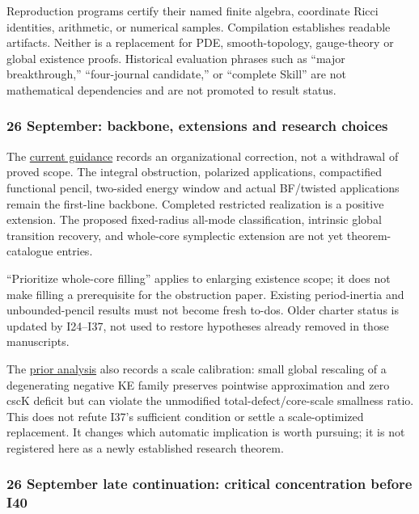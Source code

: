 \documentclass[
  10pt,
]{article}
\begin{document}
Reproduction programs certify their named finite algebra, coordinate
Ricci identities, arithmetic, or numerical samples. Compilation
establishes readable artifacts. Neither is a replacement for PDE,
smooth-topology, gauge-theory or global existence proofs. Historical
evaluation phrases such as ``major breakthrough,'' ``four-journal
candidate,'' or ``complete Skill'' are not mathematical dependencies and
are not promoted to result status.

\hypertarget{september-backbone-extensions-and-research-choices}{%
\subsubsection{26 September: backbone, extensions and research
choices}\label{september-backbone-extensions-and-research-choices}}

The \href{../guidance/LINE1_CURRENT.md}{current guidance} records an
organizational correction, not a withdrawal of proved scope. The
integral obstruction, polarized applications, compactified functional
pencil, two-sided energy window and actual BF/twisted applications
remain the first-line backbone. Completed restricted realization is a
positive extension. The proposed fixed-radius all-mode classification,
intrinsic global transition recovery, and whole-core symplectic
extension are not yet theorem-catalogue entries.

``Prioritize whole-core filling'' applies to enlarging existence scope;
it does not make filling a prerequisite for the obstruction paper.
Existing period-inertia and unbounded-pencil results must not become
fresh to-dos. Older charter status is updated by I24--I37, not used to
restore hypotheses already removed in those manuscripts.

The \href{../guidance/source/20260926_assistant_priorities.zh.md}{prior
analysis} also records a scale calibration: small global rescaling of a
degenerating negative KE family preserves pointwise approximation and
zero cscK deficit but can violate the unmodified total-defect/core-scale
smallness ratio. This does not refute I37's sufficient condition or
settle a scale-optimized replacement. It changes which automatic
implication is worth pursuing; it is not registered here as a newly
established research theorem.

\hypertarget{september-late-continuation-critical-concentration-before-i40}{%
\subsubsection{26 September late continuation: critical concentration
before
I40}\label{september-late-continuation-critical-concentration-before-i40}}
\end{document}
